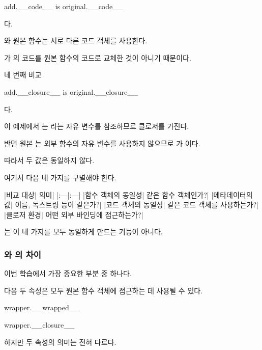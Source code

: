 \begin{dhkcode}
add.__code__ is original.__code__
\end{dhkcode}

다.

와 원본 함수는 서로 다른 코드 객체를 사용한다.

가 의 코드를 원본 함수의 코드로 교체한 것이 아니기 때문이다.

\begin{dhknote}
\begin{dhksmry}[centered]
네 번째 비교
\end{dhksmry}
\end{dhknote}

\begin{dhkcode}
add.__closure__ is original.__closure__
\end{dhkcode}

다.

이 예제에서 는 라는 자유 변수를 참조하므로 클로저를 가진다.

반면 원본 는 외부 함수의 자유 변수를 사용하지 않으므로 가 이다.

따라서 두 값은 동일하지 않다.

여기서 다음 네 가지를 구별해야 한다.

\begin{dhktable}
|비교 대상|	의미|
|:---|:---|
|함수 객체의 동일성|	같은 함수 객체인가?|
|메타데이터의 값|	이름, 독스트링 등이 같은가?|
|코드 객체의 동일성|	같은 코드 객체를 사용하는가?|
|클로저 환경|	어떤 외부 바인딩에 접근하는가?|
\end{dhktable}

는 이 네 가지를 모두 동일하게 만드는 기능이 아니다.

\subsubsection{와 의 차이}

이번 학습에서 가장 중요한 부분 중 하나다.

다음 두 속성은 모두 원본 함수 객체에 접근하는 데 사용될 수 있다.

\begin{dhkcode}
wrapper.__wrapped__

wrapper.__closure__
\end{dhkcode}

하지만 두 속성의 의미는 전혀 다르다.


